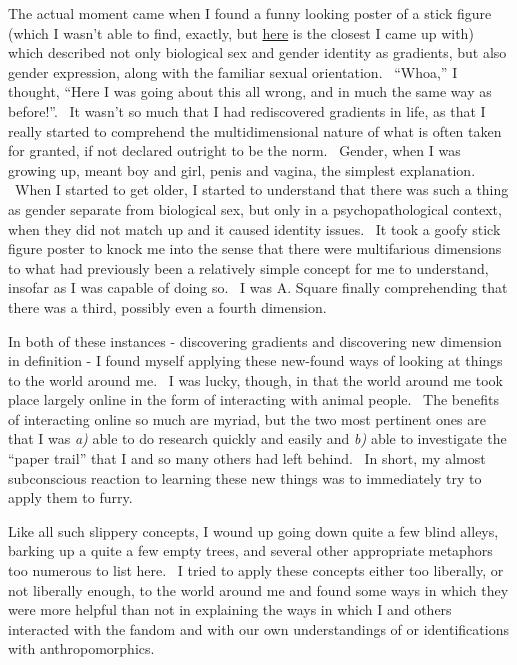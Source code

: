 The actual moment came when I found a funny looking poster of a stick
figure (which I wasn't able to find, exactly, but
\href{http://itspronouncedmetrosexual.com/2012/01/the-genderbread-person/}{here}
is the closest I came up with) which described not only biological sex
and gender identity as gradients, but also gender expression, along with
the familiar sexual orientation. ~``Whoa,'' I thought, ``Here I was
going about this all wrong, and in much the same way as before!''. ~It
wasn't so much that I had rediscovered gradients in life, as that I
really started to comprehend the multidimensional nature of what is
often taken for granted, if not declared outright to be the norm.
~Gender, when I was growing up, meant boy and girl, penis and vagina,
the simplest explanation. ~When I started to get older, I started to
understand that there was such a thing as gender separate from
biological sex, but only in a psychopathological context, when they did
not match up and it caused identity issues. ~It took a goofy stick
figure poster to knock me into the sense that there were multifarious
dimensions to what had previously been a relatively simple concept for
me to understand, insofar as I was capable of doing so. ~I was A. Square
finally comprehending that there was a third, possibly even a fourth
dimension.

In both of these instances - discovering gradients and discovering new
dimension in definition - I found myself applying these new-found ways
of looking at things to the world around me. ~I was lucky, though, in
that the world around me took place largely online in the form of
interacting with animal people. ~The benefits of interacting online so
much are myriad, but the two most pertinent ones are that I was
\emph{a)} able to do research quickly and easily and \emph{b)} able to
investigate the ``paper trail'' that I and so many others had left
behind. ~In short, my almost subconscious reaction to learning these new
things was to immediately try to apply them to furry.

Like all such slippery concepts, I wound up going down quite a few blind
alleys, barking up a quite a few empty trees, and several other
appropriate metaphors too numerous to list here. ~I tried to apply these
concepts either too liberally, or not liberally enough, to the world
around me and found some ways in which they were more helpful than not
in explaining the ways in which I and others interacted with the fandom
and with our own understandings of or identifications with
anthropomorphics.

